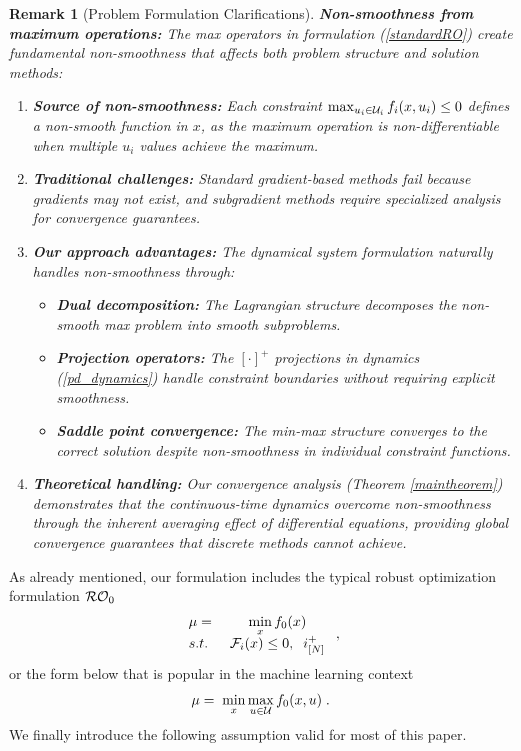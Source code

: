 \documentclass[journal,twoside,web]{ieeecolor}
\newtheorem{remark}{Remark}
\begin{document}
{\begin{remark}[Problem Formulation Clarifications]
{\textbf{Non-smoothness from maximum operations:} The max operators in formulation (\ref{standardRO}) create fundamental non-smoothness that affects both problem structure and solution methods:
\begin{enumerate}
\item \textbf{Source of non-smoothness:} Each constraint $\max_{u_i \in {\cal U}_i} f_i(x,u_i) \leq 0$ defines a non-smooth function in $x$, as the maximum operation is non-differentiable when multiple $u_i$ values achieve the maximum.
\item \textbf{Traditional challenges:} Standard gradient-based methods fail because gradients may not exist, and subgradient methods require specialized analysis for convergence guarantees.
\item \textbf{Our approach advantages:} The dynamical system formulation naturally handles non-smoothness through:
   \begin{itemize}
   \item \textbf{Dual decomposition:} The Lagrangian structure decomposes the non-smooth max problem into smooth subproblems.
   \item \textbf{Projection operators:} The $[\cdot]^+$ projections in dynamics (\ref{pd_dynamics}) handle constraint boundaries without requiring explicit smoothness.
   \item \textbf{Saddle point convergence:} The min-max structure converges to the correct solution despite non-smoothness in individual constraint functions.
   \end{itemize}
\item \textbf{Theoretical handling:} Our convergence analysis (Theorem \ref{maintheorem}) demonstrates that the continuous-time dynamics overcome non-smoothness through the inherent averaging effect of differential equations, providing global convergence guarantees that discrete methods cannot achieve.
\end{enumerate}}
\end{remark}}

As already mentioned, our formulation includes the typical robust optimization formulation ${\cal RO}_0$
\begin{equation}
\begin{array}{lcc}
\mu=&\;\displaystyle\min_x f_0(x)\\
s.t.&\; {\cal F}_i(x)\leq 0,\;\;i^+_{[N]}
\end{array}\;,
\label{RO3}
\end{equation}
or the form below that is popular in the machine learning context \cite{rafique2022,zhang2021}
\begin{equation}
\mu=\;\displaystyle\min_x\max_{u\in {\cal U}} f_0(x,u)\;.
\end{equation}
We finally introduce the following assumption valid for most of this paper.
\end{document}
